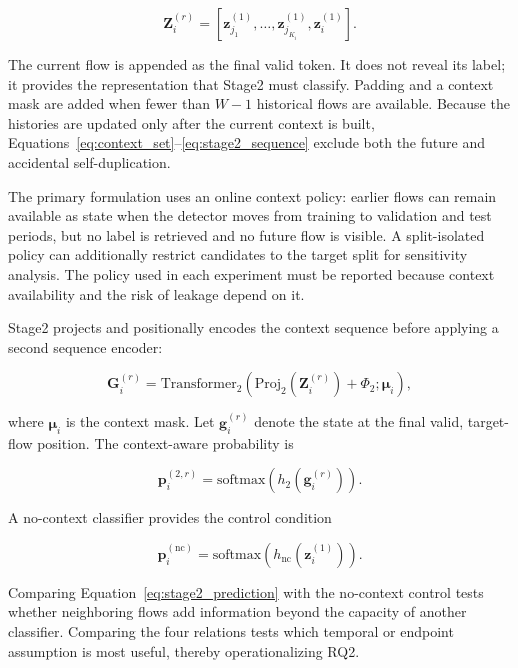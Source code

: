 \documentclass[11pt,fleqn]{report}
\begin{document}
\begin{equation}
\mathbf{Z}^{(r)}_i
=
\left[
    \mathbf{z}^{(1)}_{j_1},
    \ldots,
    \mathbf{z}^{(1)}_{j_{K_i}},
    \mathbf{z}^{(1)}_i
\right].
\label{eq:stage2_sequence}
\end{equation}

The current flow is appended as the final valid token. It does not reveal its
label; it provides the representation that Stage2 must classify. Padding and a
context mask are added when fewer than $W-1$ historical flows are available.
Because the histories are updated only after the current context is built,
Equations~\ref{eq:context_set}--\ref{eq:stage2_sequence} exclude both the future
and accidental self-duplication.

The primary formulation uses an online context policy: earlier flows can remain
available as state when the detector moves from training to validation and test
periods, but no label is retrieved and no future flow is visible. A
split-isolated policy can additionally restrict candidates to the target split
for sensitivity analysis. The policy used in each experiment must be reported
because context availability and the risk of leakage depend on it.

Stage2 projects and positionally encodes the context sequence before applying a
second sequence encoder:

\begin{equation}
\mathbf{G}^{(r)}_i
=
\mathrm{Transformer}_{2}
\left(
    \mathrm{Proj}_{2}(\mathbf{Z}^{(r)}_i)
    +\Phi_{2};
    \boldsymbol{\mu}_i
\right),
\end{equation}

where $\boldsymbol{\mu}_i$ is the context mask. Let
$\mathbf{g}^{(r)}_i$ denote the state at the final valid, target-flow position.
The context-aware probability is

\begin{equation}
\mathbf{p}^{(2,r)}_i
=
\mathrm{softmax}
\left(
    h_2(\mathbf{g}^{(r)}_i)
\right).
\label{eq:stage2_prediction}
\end{equation}

A no-context classifier provides the control condition

\begin{equation}
\mathbf{p}^{(\mathrm{nc})}_i
=
\mathrm{softmax}
\left(
    h_{\mathrm{nc}}(\mathbf{z}^{(1)}_i)
\right).
\end{equation}

Comparing Equation~\ref{eq:stage2_prediction} with the no-context control tests
whether neighboring flows add information beyond the capacity of another
classifier. Comparing the four relations tests which temporal or endpoint
assumption is most useful, thereby operationalizing RQ2.
\end{document}
